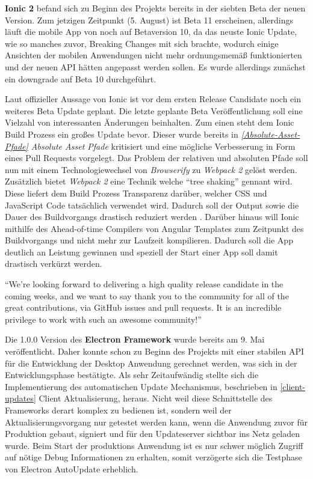 \textbf{Ionic 2} befand sich zu Beginn des Projekts bereits in der siebten Beta der neuen Version.
Zum jetzigen Zeitpunkt (5. August) ist Beta 11 erscheinen, allerdings läuft die mobile App von
\projectname{} noch auf Betaversion 10, da das neuste Ionic Update,
wie so manches zuvor, Breaking Changes mit sich brachte, wodurch einige Ansichten der
mobilen Anwendungen nicht mehr ordnungsmemäß funktionierten und der neuen API hätten angepasst werden sollen.
Es wurde allerdings zunächst ein downgrade auf Beta 10 durchgeführt.

Laut offizieller Aussage von Ionic ist vor dem ersten Release Candidate noch ein weiteres Beta Update geplant.
Die letzte geplante Beta Veröffentlichung soll eine Vielzahl von interessanten
Änderungen beinhalten. Zum einen steht dem Ionic Build Prozess ein großes Update bevor.
Dieser wurde bereits in \emph{\ref{Absolute-Asset-Pfade} Absolute Asset Pfade} kritisiert und eine
mögliche Verbesserung in Form eines Pull Requests vorgelegt.
Das Problem der relativen und absoluten Pfade soll nun mit einem Technologiewechsel von \emph{Browserify} zu \emph{Webpack 2} gelöst werden.
Zusätzlich bietet \emph{Webpack 2} eine Technik welche ``tree shaking'' gennant wird.
Diese liefert dem Build Prozess Transparenz darüber, welcher \ac{CSS} und JavaScript Code tatsächlich verwendet wird.
Dadurch soll der Output sowie die Dauer des Buildvorgangs drastisch reduziert werden \cite{Annou88:online}.
Darüber hinaus will Ionic mithilfe des Ahead-of-time Compilers von Angular Templates zum Zeitpunkt des Buildvorgangs und nicht mehr zur Laufzeit kompilieren.
Dadurch soll die App deutlich an Leistung gewinnen und speziell der Start einer App soll damit drastisch verkürzt werden.

\vspace{0.3cm}

``We’re looking forward to delivering a high quality release candidate in the coming weeks,
and we want to say thank you to the community for all of the great contributions,
via GitHub issues and pull requests. It is an incredible privilege to work with such an awesome community!'' \cite{Annou88:online}

\vspace{0.3cm}

\noindent
Die 1.0.0 Version des \textbf{Electron Framework} wurde bereits am 9. Mai veröffentlicht.
Daher konnte schon zu Beginn des Projekts \projectname{} mit einer stabilen API für die Entwicklung
der Desktop Anwendung gerechnet werden, was sich in der Entwicklungsphase bestätigte.
Als sehr Zeitaufwändig stellte sich die Implementierung des automatischen
Update Mechanismus, beschrieben in \ref{client-updates} Client Aktualisierung, heraus.
Nicht weil diese Schnittstelle des Frameworks derart komplex zu bedienen ist, sondern weil der Aktualisierungsvorgang nur getestet werden kann,
wenn die Anwendung zuvor für Produktion gebaut, signiert und für den Updateserver sichtbar ins Netz geladen wurde.
Beim Start der produktions Anwendung ist es nur schwer möglich Zugriff auf nötige Debug Informationen zu erhalten,
somit verzögerte sich die Testphase von Electron AutoUpdate erheblich.


